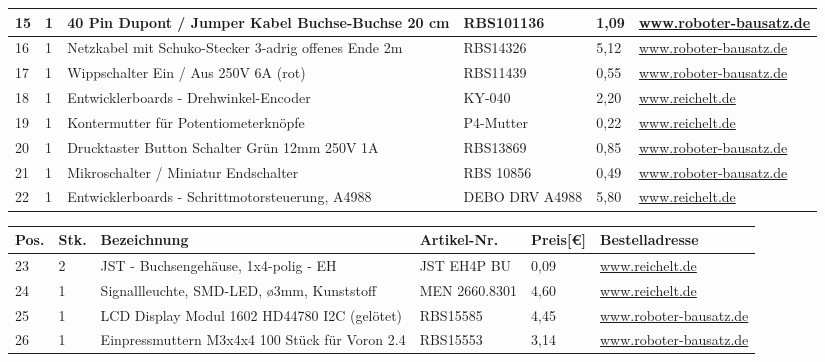 \documentclass[12pt,a4paper]{scrbook}
\begin{document}
\begin{center}
\begin{tabularx}{\textwidth}{|p{0.4cm}|p{0.4cm}|X|X|p{1cm}|X|}
		\hline
		15 & 1 & 40 Pin Dupont / Jumper Kabel Buchse-Buchse 20 cm & RBS101136 & 1,09 & \href{https://www.roboter-bausatz.de/p/40-pin-dupont-jumper-kabel-buchse-buchse-20-cm}{www.roboter-bausatz.de} \\
		\hline
		16 & 1 & Netzkabel mit Schuko-Stecker 3-adrig offenes Ende 2m & RBS14326 & 5,12 & \href{https://www.roboter-bausatz.de/p/netzkabel-mit-schuko-stecker-3-adrig-offenes-ende-2m}{www.roboter-bausatz.de} \\
		\hline
		17 & 1 & Wippschalter Ein / Aus 250V 6A (rot) & RBS11439 & 0,55 & \href{https://www.roboter-bausatz.de/p/wippschalter-ein-aus-250v-6a-rot}{www.roboter-bausatz.de} \\
		\hline
		18 & 1 & Entwicklerboards - Drehwinkel-Encoder & KY-040 & 2,20 & \href{www.reichelt.de}{www.reichelt.de} \\
		\hline
		19 & 1 & Kontermutter für Potentiometerknöpfe & P4-Mutter & 0,22 & \href{www.reichelt.de}{www.reichelt.de} \\
		\hline
		20 & 1 & Drucktaster Button Schalter Grün 12mm 250V 1A  & RBS13869 & 0,85 & \href{https://www.roboter-bausatz.de/p/drucktaster-button-schalter-gruen-12mm-250v-1a}{www.roboter-bausatz.de} \\
		\hline
		21 & 1 & Mikroschalter / Miniatur Endschalter & RBS 10856 & 0,49 & \href{https://www.roboter-bausatz.de/p/mikroschalter-miniatur-endschalter}{www.roboter-bausatz.de} \\
		\hline
		22 & 1 & Entwicklerboards - Schrittmotorsteuerung, A4988 & DEBO DRV A4988 & 5,80 & \href{https://wwww.reichelt.de}{www.reichelt.de} \\
		\hline
			\end{tabularx}
			\newpage
		\fontsize{8}{10}\selectfont
		\begin{tabularx}{\textwidth}{|p{0.4cm}|p{0.4cm}|X|X|p{1cm}|X|}
		\hline 
		\textbf{Pos.} & \textbf{Stk.} & \textbf{Bezeichnung} & \textbf{Artikel-Nr.} & \textbf{Preis[€]} & \textbf{Bestelladresse} \\ \hline
		23 & 2 & JST - Buchsengehäuse, 1x4-polig - EH & JST EH4P BU & 0,09 & \href{https://wwww.reichelt.de}{www.reichelt.de} \\
		\hline
		24 & 1 & Signallleuchte, SMD-LED, ø3mm, Kunststoff & MEN 2660.8301 & 4,60 & \href{https://wwww.reichelt.de}{www.reichelt.de} \\
		\hline
		25 & 1 & LCD Display Modul 1602 HD44780 I2C (gelötet) & RBS15585 & 4,45 & \href{https://www.roboter-bausatz.de/p/lcd-display-modul-1602-hd44780-i2c-geloetet}{www.roboter-bausatz.de} \\
		\hline
		26 & 1 & Einpressmuttern M3x4x4 100 Stück für Voron 2.4 & RBS15553 & 3,14 & \href{https://www.roboter-bausatz.de/p/einpressmuttern-m3x4x4-100-stueck-fuer-voron-2.4}{www.roboter-bausatz.de} \\
		\hline
	\end{tabularx}
	
\end{center}
\end{document}
